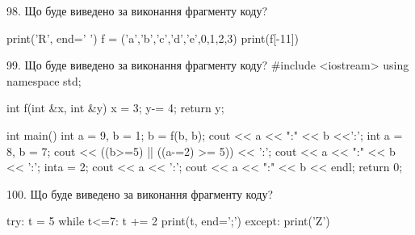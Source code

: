 \documentclass[11pt]{article}
\begin{document}
98. Що буде виведено за виконання фрагменту коду?

print('R', end=' ')
f = ('a','b','c','d','e',0,1,2,3)
print(f[-11])



99. Що буде виведено за виконання фрагменту коду?
#include <iostream>
using namespace std;

int f(int &x, int &y){
    x = 3;
    y-= 4;
    return y;
}

int main(){
    int a = 9, b = 1;
    b = f(b, b);
    cout << a << ":" << b <<':';
    {
        int a = 8, b = 7;
        cout << ((b>=5) || ((a-=2) >= 5)) << ':';
        cout << a << ":" << b << ':';
    }
    {
        inta = 2;
        cout << a << ':';
    }
    cout << a << ":" << b << endl;
    return 0;
}



100. Що буде виведено за виконання фрагменту коду?

try:
    t = 5
    while t<=7:
        t += 2
    print(t, end=';')
except:
    print('Z')



\newpage
\end{document}

